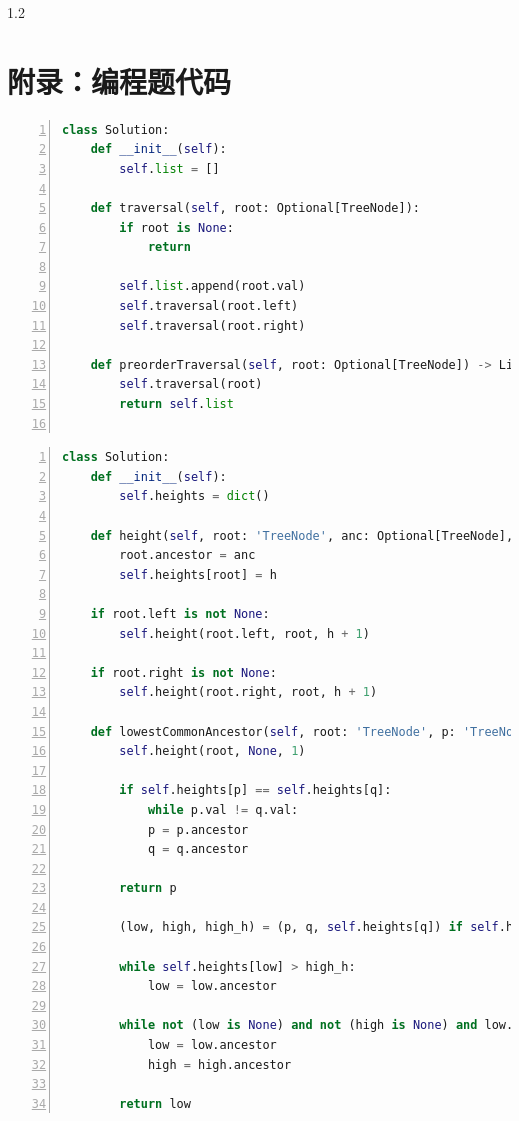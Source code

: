 \documentclass[a4paper,twoside]{article}
\begin{document}
\begin{spacing}{1.2}
\newpage
\clearpage

\appendix


\section{附录：编程题代码}
\label{sec:code}

\begin{lstlisting}[language=Python,numbers=left,style=PythonStyle,caption=求先序遍历,label={code:lc144}]
class Solution:
	def __init__(self):
		self.list = []
	
	def traversal(self, root: Optional[TreeNode]):
		if root is None:
			return
		
		self.list.append(root.val)
		self.traversal(root.left)
		self.traversal(root.right)
	
	def preorderTraversal(self, root: Optional[TreeNode]) -> List[int]:
		self.traversal(root)
		return self.list
	
\end{lstlisting}

\begin{lstlisting}[language=Python,numbers=left,style=PythonStyle,caption=求LCA,label={code:lc236}]
class Solution:
	def __init__(self):
		self.heights = dict()
	
	def height(self, root: 'TreeNode', anc: Optional[TreeNode], h):
		root.ancestor = anc
		self.heights[root] = h
	
	if root.left is not None:
		self.height(root.left, root, h + 1)
	
	if root.right is not None:
		self.height(root.right, root, h + 1)

	def lowestCommonAncestor(self, root: 'TreeNode', p: 'TreeNode', q: 'TreeNode') -> 'TreeNode':
		self.height(root, None, 1)
		
		if self.heights[p] == self.heights[q]:
			while p.val != q.val:
			p = p.ancestor
			q = q.ancestor
		
		return p
		
		(low, high, high_h) = (p, q, self.heights[q]) if self.heights[p] > self.heights[q] else (q, p, self.heights[p])
		
		while self.heights[low] > high_h:
			low = low.ancestor
		
		while not (low is None) and not (high is None) and low.val != high.val:
			low = low.ancestor
			high = high.ancestor
		
		return low
\end{lstlisting}


\end{spacing}
\end{document}
